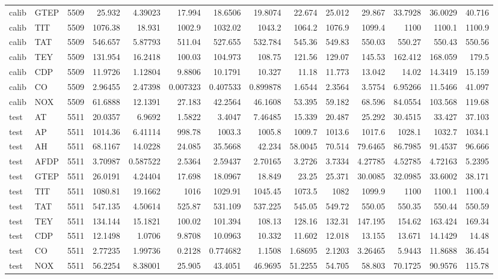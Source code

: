 \begin{tabular}{llrrrrrrrrrrrr}
calib & GTEP & 5509 & 25.932 & 4.39023 & 17.994 & 18.6506 & 19.8074 & 22.674 & 25.012 & 29.867 & 33.7928 & 36.0029 & 40.716 \\
calib & TIT & 5509 & 1076.38 & 18.931 & 1002.9 & 1032.02 & 1043.2 & 1064.2 & 1076.9 & 1099.4 & 1100 & 1100.1 & 1100.9 \\
calib & TAT & 5509 & 546.657 & 5.87793 & 511.04 & 527.655 & 532.784 & 545.36 & 549.83 & 550.03 & 550.27 & 550.43 & 550.56 \\
calib & TEY & 5509 & 131.954 & 16.2418 & 100.03 & 104.973 & 108.75 & 121.56 & 129.07 & 145.53 & 162.412 & 168.059 & 179.5 \\
calib & CDP & 5509 & 11.9726 & 1.12804 & 9.8806 & 10.1791 & 10.327 & 11.18 & 11.773 & 13.042 & 14.02 & 14.3419 & 15.159 \\
calib & CO & 5509 & 2.96455 & 2.47398 & 0.007323 & 0.407533 & 0.899878 & 1.6544 & 2.3564 & 3.5754 & 6.95266 & 11.5466 & 41.097 \\
calib & NOX & 5509 & 61.6888 & 12.1391 & 27.183 & 42.2564 & 46.1608 & 53.395 & 59.182 & 68.596 & 84.0554 & 103.568 & 119.68 \\
test & AT & 5511 & 20.0357 & 6.9692 & 1.5822 & 3.4047 & 7.46485 & 15.339 & 20.487 & 25.292 & 30.4515 & 33.427 & 37.103 \\
test & AP & 5511 & 1014.36 & 6.41114 & 998.78 & 1003.3 & 1005.8 & 1009.7 & 1013.6 & 1017.6 & 1028.1 & 1032.7 & 1034.1 \\
test & AH & 5511 & 68.1167 & 14.0228 & 24.085 & 35.5668 & 42.234 & 58.0045 & 70.514 & 79.6465 & 86.7985 & 91.4537 & 96.666 \\
test & AFDP & 5511 & 3.70987 & 0.587522 & 2.5364 & 2.59437 & 2.70165 & 3.2726 & 3.7334 & 4.27785 & 4.52785 & 4.72163 & 5.2395 \\
test & GTEP & 5511 & 26.0191 & 4.24404 & 17.698 & 18.0967 & 18.849 & 23.25 & 25.371 & 30.0085 & 32.0985 & 33.6002 & 38.171 \\
test & TIT & 5511 & 1080.81 & 19.1662 & 1016 & 1029.91 & 1045.45 & 1073.5 & 1082 & 1099.9 & 1100 & 1100.1 & 1100.4 \\
test & TAT & 5511 & 547.135 & 4.50614 & 525.87 & 531.109 & 537.225 & 545.05 & 549.72 & 550.05 & 550.35 & 550.44 & 550.59 \\
test & TEY & 5511 & 134.144 & 15.1821 & 100.02 & 101.394 & 108.13 & 128.16 & 132.31 & 147.195 & 154.62 & 163.424 & 169.34 \\
test & CDP & 5511 & 12.1498 & 1.0706 & 9.8708 & 10.0963 & 10.332 & 11.602 & 12.018 & 13.155 & 13.671 & 14.1429 & 14.48 \\
test & CO & 5511 & 2.77235 & 1.99736 & 0.2128 & 0.774682 & 1.1508 & 1.68695 & 2.1203 & 3.26465 & 5.9443 & 11.8688 & 36.454 \\
test & NOX & 5511 & 56.2254 & 8.38001 & 25.905 & 43.4051 & 46.9695 & 51.2255 & 54.705 & 58.803 & 70.1725 & 90.9576 & 115.78 \\
\bottomrule
\end{tabular}
